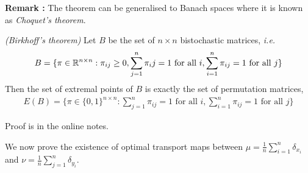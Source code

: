 \documentclass[12pt,a4paper]{article}
\newenvironment{proof}
{\begin{changemargin}{1cm}{0.5cm} 
	}%
	{\end{changemargin}
}
\newenvironment{p}
{\begin{proof} 
	}%
	{\end{proof}
}
\begin{document}
\textbf{Remark : } The theorem can be generalised to Banach spaces where it is known as \emph{Choquet's theorem}.
\s

 \emph{(Birkhoff's theorem)} Let $B$ be the set of $n\times n$ bistochastic matrices, \textit{i.e.}
\begin{align*}
B =\{ \pi \in \mathbb{R}^{n\times n} : \pi_{ij} \geq 0, \sum_{j=1}^n \pi_ij =1 \text{ for all } i, \sum_{i=1}^n \pi_{ij}=1 \text{ for all  }j\}
\end{align*}
Then the set of extremal points of $B$ is exactly the set of permutation matrices, 
\begin{align*}
E(B) = \{\pi \in \{0,1\}^{n\times n} : \sum_{j=1}^n \pi_{ij}=1\text{ for all }i, \sum_{i=1}^n \pi_{ij}=1 \text{ for all }j \}
\end{align*}
\begin{p}
\pf Proof is in the online notes.
\end{p}
\s

We now prove the existence of optimal transport maps between $\mu = \frac{1}{n} \sum_{i=1}^n \delta_{x_i}$ and $\nu = \frac{1}{n} \sum_{j=1}^n \delta_{y_i}$.
\s
\end{document}

